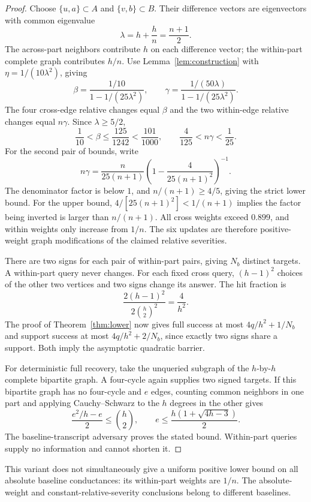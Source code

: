 \documentclass[11pt,letterpaper]{article}
\begin{document}
\begin{proof}
Choose $\{u,a\}\subset A$ and $\{v,b\}\subset B$. Their difference vectors are eigenvectors with common eigenvalue
\[
 \lambda=h+\frac hn=\frac{n+1}{2}.
\]
The across-part neighbors contribute $h$ on each difference vector; the within-part complete graph contributes $h/n$. Use Lemma~\ref{lem:construction} with $\eta=1/(10\lambda^2)$, giving
\[
 \beta=\frac{1/10}{1-1/(25\lambda^2)},\qquad
 \gamma=\frac{1/(50\lambda)}{1-1/(25\lambda^2)}.
\]
The four cross-edge relative changes equal $\beta$ and the two within-edge relative changes equal $n\gamma$. Since $\lambda\ge5/2$,
\[
 \frac1{10}<\beta\le\frac{125}{1242}<\frac{101}{1000},\qquad
 \frac4{125}<n\gamma<\frac1{25}.
\]
For the second pair of bounds, write
\[
 n\gamma=\frac{n}{25(n+1)}
       \left(1-\frac{4}{25(n+1)^2}\right)^{-1}.
\]
The denominator factor is below $1$, and $n/(n+1)\ge4/5$, giving the strict lower bound. For the upper bound, $4/[25(n+1)^2]<1/(n+1)$ implies the factor being inverted is larger than $n/(n+1)$. All cross weights exceed $0.899$, and within weights only increase from $1/n$. The six updates are therefore positive-weight graph modifications of the claimed relative severities.

There are two signs for each pair of within-part pairs, giving $N_b$ distinct targets. A within-part query never changes. For each fixed cross query, $(h-1)^2$ choices of the other two vertices and two signs change its answer. The hit fraction is
\[
 \frac{2(h-1)^2}{2\binom h2^2}=\frac4{h^2}.
\]
The proof of Theorem~\ref{thm:lower} now gives full success at most $4q/h^2+1/N_b$ and support success at most $4q/h^2+2/N_b$, since exactly two signs share a support. Both imply the asymptotic quadratic barrier.

For deterministic full recovery, take the unqueried subgraph of the $h$-by-$h$ complete bipartite graph. A four-cycle again supplies two signed targets. If this bipartite graph has no four-cycle and $e$ edges, counting common neighbors in one part and applying Cauchy--Schwarz to the $h$ degrees in the other gives
\[
 \frac{e^2/h-e}{2}\le\binom h2,
 \qquad e\le\frac{h(1+\sqrt{4h-3})}{2}.
\]
The baseline-transcript adversary proves the stated bound. Within-part queries supply no information and cannot shorten it.
\end{proof}

This variant does not simultaneously give a uniform positive lower bound on all absolute baseline conductances: its within-part weights are $1/n$. The absolute-weight and constant-relative-severity conclusions belong to different baselines.
\end{document}
